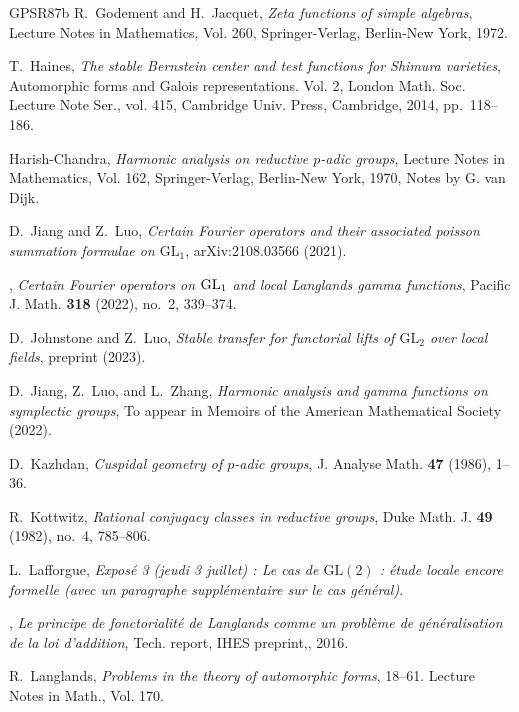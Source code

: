 \documentclass[iccmp]{ipbook}
\begin{document}
\begin{thebibliography}{GPSR87b}
R.~Godement and H.~Jacquet, \emph{Zeta functions of simple algebras}, Lecture
  Notes in Mathematics, Vol. 260, Springer-Verlag, Berlin-New York, 1972.

T.~Haines, \emph{The stable {B}ernstein center and test functions for
  {S}himura varieties}, Automorphic forms and {G}alois representations. {V}ol.
  2, London Math. Soc. Lecture Note Ser., vol. 415, Cambridge Univ. Press,
  Cambridge, 2014, pp.~118--186.

Harish-Chandra, \emph{Harmonic analysis on reductive {$p$}-adic groups}, Lecture Notes
  in Mathematics, Vol. 162, Springer-Verlag, Berlin-New York, 1970, Notes by G.
  van Dijk.

D.~Jiang and Z.~Luo, \emph{Certain {F}ourier operators and their associated
  poisson summation formulae on $\mathrm{GL}_1$}, arXiv:2108.03566 (2021).

\bysame, \emph{Certain {F}ourier operators on {${\rm GL}_1$} and local
  {L}anglands gamma functions}, Pacific J. Math. \textbf{318} (2022), no.~2,
  339--374.

D.~Johnstone and Z.~Luo, \emph{Stable transfer for functorial lifts of
  $\mathrm{GL}_2$ over local fields}, preprint (2023).

D.~Jiang, Z.~Luo, and L.~Zhang, \emph{Harmonic analysis and gamma functions on
  symplectic groups}, To appear in Memoirs of the American Mathematical Society
  (2022).

D.~Kazhdan, \emph{Cuspidal geometry of {$p$}-adic groups}, J. Analyse Math.
  \textbf{47} (1986), 1--36.

R.~Kottwitz, \emph{Rational conjugacy classes in reductive groups}, Duke
  Math. J. \textbf{49} (1982), no.~4, 785--806.

L.~Lafforgue, \emph{Expos{\'e} 3 (jeudi 3 juillet) : Le cas de $\mathrm{GL}(2)$
  : {\'e}tude locale encore formelle (avec un paragraphe suppl{\'e}mentaire sur
  le cas g{\'e}n{\'e}ral)}.

\bysame, \emph{Le principe de fonctorialit{\'e} de {L}anglands comme un
  probl{\`e}me de g{\'e}n{\'e}ralisation de la loi d'addition}, Tech. report,
  IHES preprint,, 2016.

R.~Langlands, \emph{Problems in the theory of automorphic forms}, 18--61.
  Lecture Notes in Math., Vol. 170.


\end{thebibliography}
\end{document}
